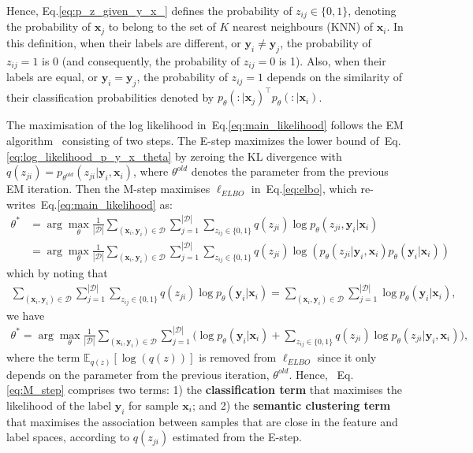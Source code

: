 \documentclass[review]{elsarticle}
\theoremstyle{plain}
\begin{document}
Hence, Eq.\ref{eq:p_z_given_y_x_} defines the
probability of $z_{ij} \in \{0,1\}$, denoting the probability of $\mathbf{x}_j$ to belong to the set of $K$ nearest neighbours (KNN) of $\mathbf{x}_i$. 
In this definition, when their labels are different, or $\mathbf{y}_i \neq \mathbf{y}_j$, the probability of $z_{ij}=1$ is 0 (and consequently, the probability of $z_{ij}=0$ is 1).
Also, when their labels are equal, or $\mathbf{y}_i = \mathbf{y}_j$, the probability of $z_{ij}=1$ depends on the similarity of their classification probabilities denoted by $p_{\theta}(:|\mathbf{x}_j)^{\top}p_{\theta}(:|\mathbf{x}_i)$.



The maximisation of the log likelihood in~Eq.\ref{eq:main_likelihood} follows the EM algorithm~\citep{dempster1977maximum} consisting of two steps. The E-step maximizes the lower bound of~Eq.\ref{eq:log_likelihood_p_y_x_theta} by zeroing the KL divergence with
$q(z_{ji})=p_{\theta^{old}}(z_{ji}|\mathbf{y}_i,\mathbf{x}_i)$, where $\theta^{old}$ denotes the parameter from the previous EM iteration.
Then the M-step maximises $\ell_{ELBO}$ in~Eq.\ref{eq:elbo}, which re-writes~Eq.\ref{eq:main_likelihood} as:
\begin{align*}
    \theta^*  & =  \arg\max_{\theta}  
    \frac{1}{|\mathcal{D}|}  \sum_{(\mathbf{x}_i,\mathbf{y}_i) \in \mathcal{D}} \sum_{j=1}^{|\mathcal{D}|} \sum_{z_{ij}\in \{0,1\}} q(z_{ji}) \log p_{\theta}(z_{ji},\mathbf{y}_i|\mathbf{x}_i)
    \\
    &  =  \arg\max_{\theta}
    \frac{1}{|\mathcal{D}|}  \sum_{(\mathbf{x}_i,\mathbf{y}_i) \in \mathcal{D}} \sum_{j=1}^{|\mathcal{D}|} \sum_{z_{ij}\in \{0,1\}} q(z_{ji}) \log \left(p_{\theta}(z_{ji}|\mathbf{y}_i,\mathbf{x}_i)p_{\theta}(\mathbf{y}_i|\mathbf{x}_i)\right)
\end{align*}
which by noting that
\begin{align*}
\sum_{(\mathbf{x}_i,\mathbf{y}_i) \in \mathcal{D}} \sum_{j=1}^{|\mathcal{D}|} \sum_{z_{ij}\in \{0,1\}} q(z_{ji})\log p_{\theta}(\mathbf{y}_i|\mathbf{x}_i) = \sum_{(\mathbf{x}_i,\mathbf{y}_i) \in \mathcal{D}} \sum_{j=1}^{|\mathcal{D}|} \log p_{\theta}(\mathbf{y}_i|\mathbf{x}_i),
\end{align*}
we have
\begin{equation}
\begin{split}
    \theta^*  =  \arg\max_{\theta}   \frac{1}{|\mathcal{D}|}  \sum_{(\mathbf{x}_i,\mathbf{y}_i) \in \mathcal{D}} \sum_{j=1}^{|\mathcal{D}|}
    \Big ( \log p_{\theta}(\mathbf{y}_i|\mathbf{x}_i) +
     \sum_{z_{ij}\in \{0,1\}} q(z_{ji})\log p_{\theta}(z_{ji}|\mathbf{y}_i,\mathbf{x}_i) \Big ) ,
    \end{split}
    \label{eq:M_step}
\end{equation}
where the term $\mathbb{E}_{q(z)}[\log(q(z))]$ is removed from $\ell_{ELBO}$ since it only depends on the parameter from the previous iteration, $\theta^{old}$.  Hence, ~Eq.\ref{eq:M_step} comprises two terms: 1) the \textbf{classification term} that maximises the likelihood of the label $\mathbf{y}_i$ for sample $\mathbf{x}_i$; and 2) the \textbf{semantic clustering term} that maximises the association between samples that are close in the feature and label spaces, according to $q(z_{ji})$ estimated from the E-step.  
\end{document}
